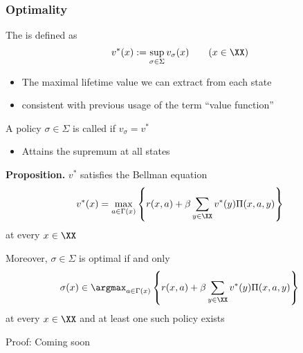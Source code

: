 \begin{frame}
    \frametitle{Optimality}
    
    The  is defined as 
    \begin{equation*}
        v^*(x) := \sup_{\sigma \in \Sigma} v_\sigma(x)
        \qquad (x \in \XX)
    \end{equation*}

    \begin{itemize}
        \item The maximal lifetime value we can extract from each state
        \vspace{0.5em}
        \item consistent with previous usage of the term ``value function''  
    \end{itemize}
    
        \vspace{0.5em}
        \vspace{0.5em}

    A policy $\sigma \in \Sigma$ is called  if $v_\sigma = v^*$
    
    \begin{itemize}
        \item Attains the supremum at all states
    \end{itemize}

\end{frame}


\begin{frame}
    
    \textbf{Proposition.} $v^*$ satisfies the Bellman equation
    \begin{equation*}
        v^*(x)
        = \max_{a \in \Gamma(x)}
        \left\{
            r(x, a)
            + \beta
            \sum_{y \in \XX} v^*(y) \Pi(x, a, y)
        \right\}
    \end{equation*}
    at every $x \in \XX$
    
        \vspace{0.5em}
    Moreover, $\sigma \in \Sigma$ is optimal if and only 
    \begin{equation*}
        \label{eq:ncdmc}
        \sigma(x)
        \in \argmax_{a \in \Gamma(x)}
        \left\{
            r(x, a)
            + \beta
            \sum_{y \in \XX} v^*(y) \Pi(x, a, y)
        \right\}
    \end{equation*}
    at every $x \in \XX$ and at least one such policy exists


        \vspace{0.5em}
    Proof: Coming soon

\end{frame}



